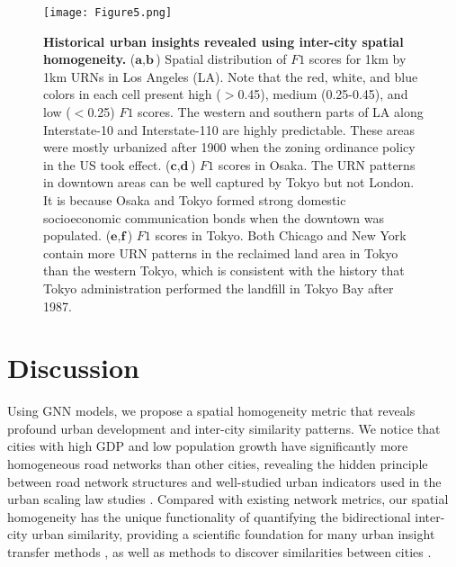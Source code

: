 \documentclass[10pt]{wlscirep}
\begin{document}
\begin{figure}[H]
\centering
\begin{minipage}{1.00\textwidth}
    \centering
  \texttt{[image: Figure5.png]}
  \label{fig:5}
\end{minipage}
\caption{\footnotesize
\textbf{Historical urban insights revealed using inter-city spatial homogeneity.} ($\textbf{a},\textbf{b}$) Spatial distribution of $F1$ scores for 1km by 1km URNs in Los Angeles (LA). Note that the red, white, and blue colors in each cell present high ($>$0.45), medium (0.25-0.45), and low ($<$0.25) $F1$ scores. The western and southern parts of LA along Interstate-10 and Interstate-110 are highly predictable. These areas were mostly urbanized after 1900 when the zoning ordinance policy in the US took effect. ($\textbf{c}, \textbf{d}$) $F1$ scores in Osaka. The URN patterns in downtown areas can be well captured by Tokyo but not London. It is because Osaka and Tokyo formed strong domestic socioeconomic communication bonds when the downtown was populated. ($\textbf{e},\textbf{f}$) $F1$ scores in Tokyo. Both Chicago and New York contain more URN patterns in the reclaimed land area in Tokyo than the western Tokyo, which is consistent with the history that Tokyo administration performed the landfill in Tokyo Bay after 1987.
}
\label{fig:5}
\end{figure}


\section*{Discussion}
Using GNN models, we propose a spatial homogeneity metric that reveals profound urban development and inter-city similarity patterns. We notice that cities with high GDP and low population growth have significantly more homogeneous road networks than other cities, revealing the hidden principle between road network structures and well-studied urban indicators used in the urban scaling law studies \cite{bettencourt2007growth,arcaute2015constructing,bettencourt2020urban, molinero2021geometry}. Compared with existing network metrics, our spatial homogeneity has the unique functionality of quantifying the bidirectional inter-city urban similarity, providing a scientific foundation for many urban insight transfer methods \cite{wei2016transfer,dai2009eigentransfer,dong2019predicting}, as well as methods to discover similarities between cities \cite{currid2010two}. 
\end{document}

